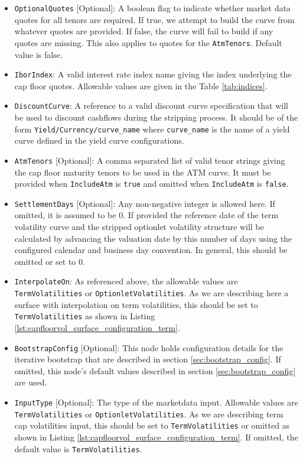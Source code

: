 \begin{itemize}
\item \lstinline!OptionalQuotes! [Optional]:
A boolean flag to indicate whether market data quotes for all tenors are required. If true, we attempt to build the curve from whatever quotes are provided. If false, the curve will fail to build if any quotes are missing. This also applies to quotes for the \lstinline!AtmTenors!. Default value is false.

\item \lstinline!IborIndex!:
A valid interest rate index name giving the index underlying the cap floor quotes. Allowable values are given in the Table \ref{tab:indices}.

\item \lstinline!DiscountCurve!:
A reference to a valid discount curve specification that will be used to discount cashflows during the stripping process. It should be of the form \lstinline!Yield/Currency/curve_name! where \lstinline!curve_name! is the name of a yield curve defined in the yield curve configurations.

\item \lstinline!AtmTenors! [Optional]:
A comma separated list of valid tenor strings giving the cap floor maturity tenors to be used in the ATM curve. It must be provided when \lstinline!IncludeAtm! is \lstinline!true! and omitted when \lstinline!IncludeAtm! is \lstinline!false!.

\item \lstinline!SettlementDays! [Optional]:
Any non-negative integer is allowed here. If omitted, it is assumed to be 0. If provided the reference date of the term volatility curve and the stripped optionlet volatility structure will be calculated by advancing the valuation date by this number of days using the configured calendar and business day convention. In general, this should be omitted or set to 0.

\item \lstinline!InterpolateOn!:
As referenced above, the allowable values are \lstinline!TermVolatilities! or \lstinline!OptionletVolatilities!. As we are describing here a surface with interpolation on term volatilities, this should be set to \lstinline!TermVolatilities! as shown in Listing \ref{lst:capfloorvol_surface_configuration_term}.

\item \lstinline!BootstrapConfig! [Optional]:
This node holds configuration details for the iterative bootstrap that are described in section \ref{sec:bootstrap_config}. If omitted, this node's default values described in section \ref{sec:bootstrap_config} are used.

\item \lstinline!InputType! [Optional]:
The type of the marketdata input. Allowable values are \lstinline!TermVolatilities! or \lstinline!OptionletVolatilities!. As we are describing term cap volatilities input, this should be set to \lstinline!TermVolatilities! or omitted as shown in Listing \ref{lst:capfloorvol_surface_configuration_term}. If omitted, the default value is \lstinline!TermVolatilities!.

\end{itemize}

